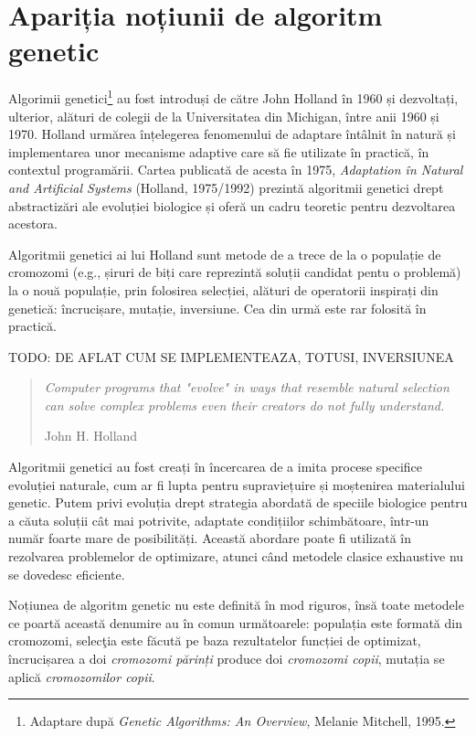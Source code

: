 \section{Apariția noțiunii de algoritm genetic} 
 
Algorimii genetici\footnote{Adaptare după \textit{Genetic Algorithms: An Overview}, Melanie Mitchell, 1995.} au fost introduși de către John Holland în 1960 și dezvoltați, ulterior, alături de colegii de la Universitatea din Michigan, între anii 1960 și 1970. Holland urmărea înțelegerea fenomenului de adaptare întâlnit în natură și implementarea unor mecanisme adaptive care să fie utilizate în practică, în contextul programării. Cartea publicată de acesta în 1975, \textit{Adaptation în Natural and Artificial Systems} (Holland, 1975/1992) prezintă algoritmii genetici drept abstractizări ale evoluției biologice și oferă un cadru teoretic pentru dezvoltarea acestora.

Algoritmii genetici ai lui Holland sunt metode de a trece de la o populație de cromozomi (e.g., șiruri de biți care reprezintă soluții candidat pentu o problemă) la o nouă populație, prin folosirea selecției, alături de operatorii inspirați din genetică: încrucișare, mutație, inversiune. Cea din urmă este rar folosită în practică.

TODO: DE AFLAT CUM SE IMPLEMENTEAZA, TOTUSI, INVERSIUNEA \\

\begin{quote} 
	\textit{Computer programs that "evolve" in ways that resemble natural selection can solve complex problems even their creators do not fully understand.}
	\begin{flushright}
		John H. Holland 
	\end{flushright}
\end{quote}

\clearpage

Algoritmii genetici au fost creați în încercarea de a imita procese specifice evoluției naturale, cum ar fi lupta pentru supraviețuire și moștenirea materialului genetic. Putem privi evoluția drept strategia abordată de speciile biologice pentru a căuta soluții cât mai potrivite, adaptate condițiilor schimbătoare, într-un număr foarte mare de posibilități. Această abordare poate fi utilizată în rezolvarea problemelor de optimizare, atunci când metodele clasice exhaustive nu se dovedesc eficiente. 
 
Noțiunea de algoritm genetic nu este definită în mod riguros\cite{introduction_by_melanie_mitchell}, însă toate metodele ce poartă această denumire au în comun următoarele: populația este formată din cromozomi, selecţia este făcută pe baza rezultatelor funcției de optimizat, încrucișarea a doi \textit{cromozomi părinți} produce doi \textit{cromozomi copii}, mutația se aplică \textit{cromozomilor copii}. 

